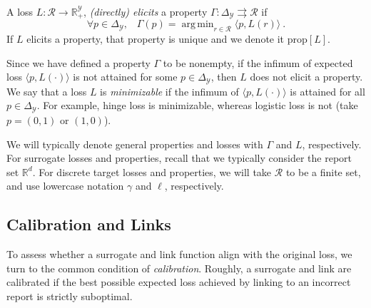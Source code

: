 \documentclass[twoside,11pt]{article}
\newcommand{\Comments}{1}
\newcommand{\mynote}[2]{\ifnum\Comments=1\textcolor{#1}{#2}\fi}
\newcommand{\raf}[1]{\mynote{darkgreen}{[RF: #1]}}
\newcommand{\reals}{\mathbb{R}}
\newcommand{\prop}[1]{\mathrm{prop}[#1]}
\newcommand{\simplex}{\Delta_\Y}
\newcommand{\R}{\mathcal{R}}
\newcommand{\X}{\mathcal{X}}
\newcommand{\Y}{\mathcal{Y}}
\newcommand{\inprod}[2]{\langle #1, #2 \rangle}%
\newcommand{\toto}{\rightrightarrows}
\DeclareMathOperator*{\argmin}{arg\,min}
\begin{document}
\begin{definition}
  \label{def:elicits}
  A loss $L:\R\to\reals^\Y_+$, \emph{(directly) elicits} a property $\Gamma:\simplex \toto \R$ if
  \begin{equation}
    \forall p\in\simplex,\;\;\;\Gamma(p) = \argmin_{r \in \R} \inprod{p}{L(r)}~.
  \end{equation}
  If $L$ elicits a property, that property is unique and we denote it $\prop{L}$.
\end{definition}
Since we have defined a property $\Gamma$ to be nonempty, if the infimum of expected loss $\inprod{p}{L(\cdot)}$ is not attained for some $p \in \simplex$, then $L$ does not elicit a property.
We say that a loss $L$ is \emph{minimizable} if the infimum of $\inprod{p}{L(\cdot)}$ is attained for all $p \in \simplex$.
For example, hinge loss is minimizable, whereas logistic loss is not (take $p=(0,1)$ or $(1,0)$).

We will typically denote general properties and losses with $\Gamma$ and $L$, respectively.
For surrogate losses and properties, recall that we typically consider the report set $\reals^d$.
For discrete target losses and properties, we will take $\R$ to be a finite set, and use lowercase notation $\gamma$ and $\ell$, respectively.


\subsection{Calibration and Links}
\label{subsec:calibration-links}


To assess whether a surrogate and link function align with the original loss, we turn to the common condition of \emph{calibration}.
Roughly, a surrogate and link are calibrated if the best possible expected loss achieved by linking to an incorrect report is strictly suboptimal.




\end{document}
